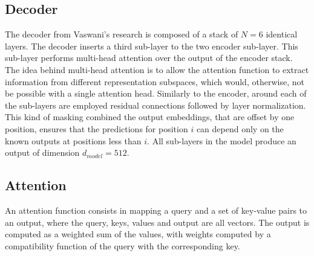 \documentclass[\main/main.tex]{subfiles}
\begin{document}
\subsection{Decoder}
The decoder from Vaswani's research \cite{vaswani2017attention} is composed of a stack of $N=6$ identical layers. The decoder inserts a third sub-layer to the two encoder sub-layer. This sub-layer performs multi-head attention over the output of the encoder stack. The idea behind multi-head attention is to allow the attention function to extract information from different representation subspaces, which would, otherwise, not be possible with a single attention head. Similarly to the encoder, around each of the sub-layers are employed residual connections followed by layer normalization. This kind of masking combined the output embeddings, that are offset by one position, ensures that the predictions for position $i$ can depend only on the known outputs at positions less than $i$. All sub-layers in the model produce an output of dimension $d_{model} = 512$.

\subsection{Attention}
An attention function consists in mapping a query and a set of key-value pairs to an output, where the query, keys, values and output are all vectors. The output is computed as a weighted sum of the values, with weights computed by a compatibility function of the query with the corresponding key.
\end{document}
